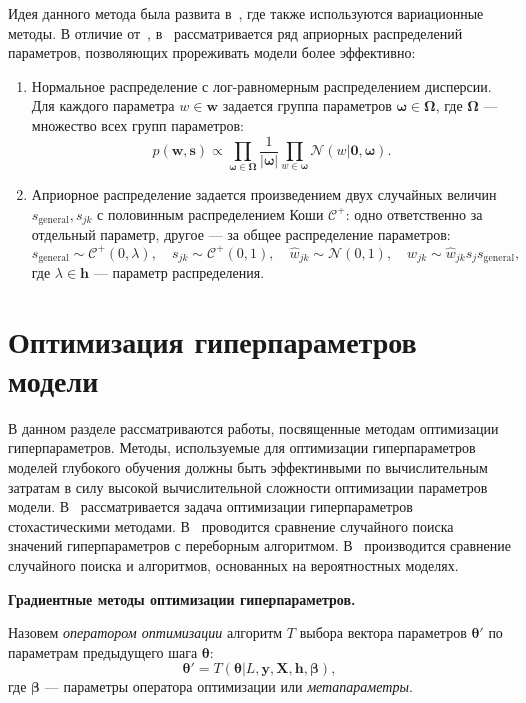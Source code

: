 Идея данного метода была развита в~\cite{bayes_compr}, где также используются вариационные методы.  В отличие от~\cite{nips}, в~\cite{bayes_compr} рассматривается ряд априорных распределений параметров, позволяющих прореживать модели более эффективно:
\begin{enumerate}
\item Нормальное распределение с лог-равномерным распределением дисперсии. Для каждого параметра $w \in \mathbf{w}$ задается группа параметров $\boldsymbol{\omega} \in \boldsymbol{\Omega}$, где $\boldsymbol{\Omega}$ --- множество всех групп параметров:
\[
    p(\mathbf{w}, \mathbf{s}) \propto \prod_{\boldsymbol{\omega} \in \boldsymbol{\Omega}} \frac{1}{|\boldsymbol{\omega}|}\prod_{w \in \boldsymbol{\omega}}\mathcal{N}(w|\mathbf{0}, \boldsymbol{\omega}).
\]
\item Априорное распределение задается произведением двух случайных величин ${s}_{\text{general}}, {s}_{jk}$ с половинным распределением Коши $\mathcal{C}^{+}$: одно ответственно за отдельный параметр, другое --- за общее распределение параметров:
\[
    {s}_{\text{general}} \sim \mathcal{C}^{+}(0, \lambda), \quad  {s}_{jk} \sim \mathcal{C}^{+}(0,1), \quad \hat{w}_{jk} \sim \mathcal{N}(0,1), \quad w_{jk} \sim \hat{w}_{jk}s_j  {s}_{\text{general}},
\]
где $\lambda \in \mathbf{h}$ --- параметр распределения.

\end{enumerate}

\section{Оптимизация гиперпараметров модели}
В данном разделе рассматриваются работы, посвященные методам оптимизации гиперпараметров. Методы, используемые для оптимизации гиперпараметров моделей глубокого обучения должны быть эффектинвыми по вычислительным затратам в силу высокой вычислительной сложности оптимизации параметров модели. 
В~\cite{random1,random2} рассматривается задача оптимизации гиперпараметров стохастическими методами. В~\cite{random1} проводится сравнение случайного поиска значений гиперпараметров с переборным алгоритмом. В~\cite{random2} производится сравнение случайного поиска и алгоритмов, основанных на вероятностных моделях.

\textbf{Градиентные методы оптимизации гиперпараметров. } 
\begin{defin} Назовем \textit{оператором оптимизации} алгоритм $T$ выбора вектора параметров $\boldsymbol{\theta}'$  по параметрам предыдущего шага $\boldsymbol{\theta}$:
\begin{equation}
\label{eq:optim_operator}
	\boldsymbol{\theta}' = T(\boldsymbol{\theta} | L, \mathbf{y}, \mathbf{X}, \mathbf{h}, \boldsymbol{\beta}),
\end{equation}
где $\boldsymbol{\beta}$ --- параметры оператора оптимизации или \textit{метапараметры}.
\end{defin}

